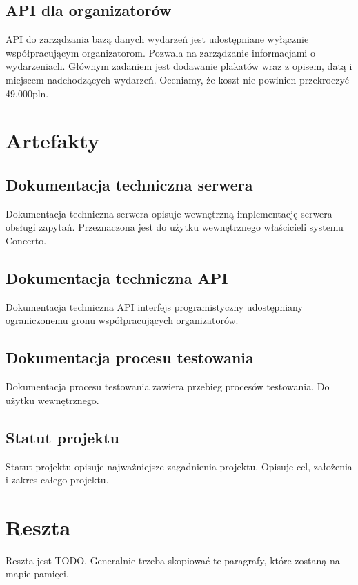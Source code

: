 \documentclass[10pt]{dokument-ppi}
\begin{document}
\subsection{API dla organizatorów}
API do zarządzania bazą danych wydarzeń jest udostępniane wyłącznie współpracującym organizatorom. Pozwala na zarządzanie informacjami o wydarzeniach. Głównym zadaniem jest dodawanie plakatów wraz z opisem, datą i miejscem nadchodzących wydarzeń. Oceniamy, że koszt nie powinien przekroczyć 49,000pln.

\section{Artefakty}

\subsection{Dokumentacja techniczna serwera}
Dokumentacja techniczna serwera opisuje wewnętrzną implementację serwera obsługi zapytań. Przeznaczona jest do użytku wewnętrznego właścicieli systemu Concerto.

\subsection{Dokumentacja techniczna API}
Dokumentacja techniczna API interfejs programistyczny udostępniany ograniczonemu gronu współpracujących organizatorów.

\subsection{Dokumentacja procesu testowania}
Dokumentacja procesu testowania zawiera przebieg procesów testowania. Do użytku wewnętrznego.

\subsection{Statut projektu}
Statut projektu opisuje najważniejsze zagadnienia projektu. Opisuje cel, założenia i zakres całego projektu.


\section{Reszta}

Reszta jest \textsc{TODO}. Generalnie trzeba skopiować te paragrafy, które
zostaną na mapie pamięci.

\newpage
\end{document}
